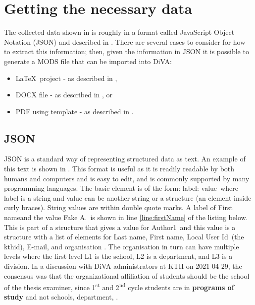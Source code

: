 \section{Getting the necessary data}
\label{sec:gettingNecessaryData}
The collected data shown in  is roughly in a format called JavaScript Object Notation (JSON) and described in . There are several cases to consider for how to extract this information; then, given the information in JSON it is possible to generate a MODS file that can be imported into DiVA:
\begin{itemize}
    \item  \LaTeX~project - as described in ,
    \item DOCX file - as described in , or
    \item PDF using template - as described in .
\end{itemize}


\subsection {JSON}
\label{sec:json}
JSON is a standard way of representing structured data as text. An example of this text is shown in . This format is useful as it is \first readily readable by both humans and computers and \Second is easy to edit, and \third is commonly supported by many programming languages. The basic element is of the form: \textquotedbl label\textquotedbl: value\ where label is a string and value can be another string or a structure (an element inside curly braces). String values are within double quote marks. A label of \textquotedbl First name\textquotedbl and the value \textquotedbl Fake A.\textquotedbl~is shown in line \ref{line:firstName} of the listing below. This is part of a structure that gives a value for \textquotedbl Author1\textquotedbl~and this value is a structure with a list of elements for \textquotedbl Last name\textquotedbl, \textquotedbl First name\textquotedbl, \textquotedbl Local User Id\textquotedbl~(\ie the kthid), \textquotedbl E-mail\textquotedbl, and \textquotedbl organisation \textquotedbl. The organisation in turn can have multiple levels where the first level L1 is the school, L2 is a department, and L3 is a division. In a discussion with DiVA administrators at KTH on 2021-04-29, the consensus was that the organizational affiliation of students should be the school of the thesis examiner, since 1\textsuperscript{st} and 2\textsuperscript{nd} cycle students are in \textbf{programs of study} and not schools, department, \etc.

